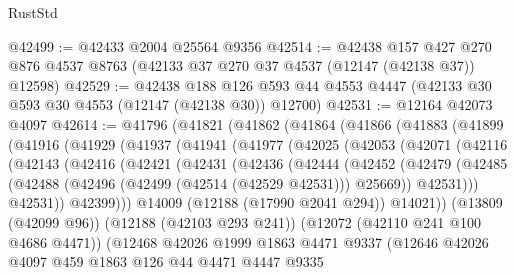 \begin{lexlean}{RustStd}
\begin{coremodule}
@42499 := @42433 @2004 @25564 @9356
@42514 := @42438
    @157
    @427
    @270
    @876
    @4537
    @8763
    (@42133 @37 @270 @37 @4537 (@12147 (@42138 @37)) @12598)
@42529 := @42438
    @188
    @126
    @593
    @44
    @4553
    @4447
    (@42133 @30 @593 @30 @4553 (@12147 (@42138 @30)) @12700)
@42531 := @12164 @42073 @4097
@42614 := @41796
    (@41821
      (@41862
        (@41864
          (@41866
            (@41883
              (@41899
                (@41916
                  (@41929
                    (@41937
                      (@41941
                        (@41977
                          (@42025
                            (@42053
                              (@42071
                                (@42116
                                  (@42143
                                    (@42416
                                      (@42421
                                        (@42431
                                          (@42436
                                            (@42444
                                              (@42452
                                                (@42479
                                                  (@42485
                                                    (@42488
                                                      (@42496
                                                        (@42499 (@42514 (@42529 @42531)))
                                                        @25669))
                                                    @42531)))
                                              @42531))
                                          @42399)))
                                    @14009
                                    (@12188 (@17990 @2041 @294))
                                    @14021))
                                (@13809 (@42099 @96))
                                (@12188 (@42103 @293 @241))
                                (@12072 (@42110 @241 @100 @4686 @4471))
                                (@12468
                                  @42026
                                  @1999
                                  @1863
                                  @4471
                                  @9337
                                  (@12646
                                    @42026
                                    @4097
                                    @459
                                    @1863
                                    @126
                                    @44
                                    @4471
                                    @4447
                                    @9335

\end{coremodule}
\end{lexlean}
